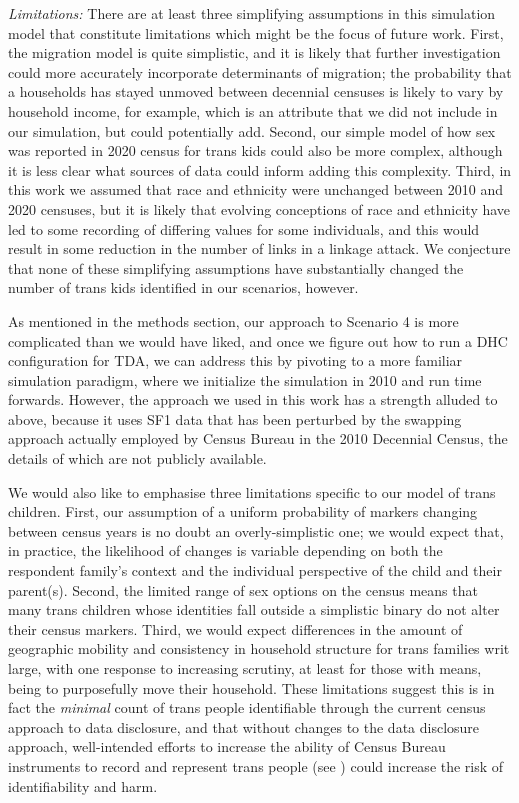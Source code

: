 \documentclass{jpc} %
\theoremstyle{plain}\newtheorem{satz}[thm]{Satz} %
\begin{document}
\emph{Limitations:}
There are at least three simplifying assumptions in this simulation model that constitute limitations which might be the focus of future work.  First, the migration model is quite simplistic, and it is likely that further investigation could more accurately incorporate determinants of migration; the probability that a households has stayed unmoved between decennial censuses is likely to vary by household income, for example, which is an attribute that we did not include in our simulation, but could potentially add.
Second, our simple model of how sex was reported in 2020 census for trans kids could also be more complex, although it is less clear what sources of data could inform adding this complexity. Third, in this work we assumed that race and ethnicity were unchanged between 2010 and 2020 censuses, but it is likely that evolving conceptions of race and ethnicity have led to some recording of differing values for some individuals, and this would result in some reduction in the number of links in a linkage attack.  We conjecture that none of these simplifying assumptions have substantially changed the number of trans kids identified in our scenarios, however.

As mentioned in the methods section, our approach to Scenario 4 is more complicated than we would have liked, and once we figure out how to run a DHC configuration for TDA, we can address this by pivoting to a more familiar simulation paradigm, where we initialize the simulation in 2010 and run time forwards.  However, the approach we used in this work has a strength alluded to above, because it uses SF1 data that has been perturbed by the swapping approach actually employed by Census Bureau in the 2010 Decennial Census, the details of which are not publicly available.

We would also like to emphasise three limitations specific to our model of trans children. First, our assumption of a uniform probability of markers changing between census years is no doubt an overly-simplistic one; we would expect that, in practice, the likelihood of changes is variable depending on both the respondent family's context and the individual perspective of the child and their parent(s). Second, the limited range of sex options on the census means that many trans children whose identities fall outside a simplistic binary do not alter their census markers. Third, we would expect differences in the amount of geographic mobility and consistency in household structure for trans families writ large, with one response to increasing scrutiny, at least for those with means, being to purposefully move their household. These limitations suggest this is in fact the \textit{minimal} count of trans people identifiable through the current census approach to data disclosure, and that without changes to the data disclosure approach, well-intended efforts to increase the ability of Census Bureau instruments to record and represent trans people (see \cite{whfactsheet}) could  increase the risk of identifiability and harm.
\end{document}
